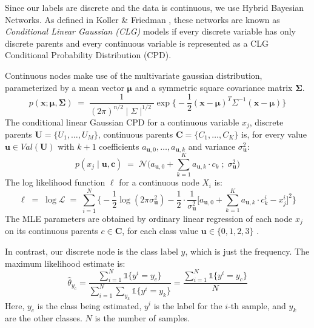 \documentclass{article}
\begin{document}
Since our labels are discrete and the data is continuous, we use
Hybrid Bayesian Networks. As defined in Koller \& Friedman \cite{koller},
these networks are known as \textit{Conditional Linear Gaussian (CLG)} models if
every discrete variable has only discrete parents and every continuous variable
is represented as a CLG Conditional Probability Distribution (CPD).

Continuous nodes make use of the multivariate gaussian distribution, parameterized
by a mean vector $\mathbf{\mu}$ and a symmetric square covariance matrix
$\mathbf{\Sigma}$.
\begin{equation}
  p(\mathbf{x}; \mathbf{\mu}, \mathbf{\Sigma}) \; = \; \frac{1}{(2 \pi)^{n/2} \mid \Sigma \mid^{1/2}} \exp \Big\{ -\frac{1}{2} (\mathbf{x} - \mathbf{\mu})^T \Sigma^{-1} (\mathbf{x} - \mathbf{\mu})  \Big\}
\end{equation}
The conditional linear Gaussian CPD for a continuous variable $x_j$, discrete
parents $\mathbf{U} = \{U_1, \hdots, U_M\}$, continuous parents
$\mathbf{C} = \{C_1, \hdots, C_K\}$ is, for every value
$\mathbf{u} \in Val(\mathbf{U})$ with $k+1$ coefficients
$a_{\mathbf{u},0}, \hdots, a_{\mathbf{u}, k}$ and variance
$\sigma^2_{\mathbf{u}}$:
\begin{equation}
  p(x_j \mid \mathbf{u}, \mathbf{c}) \; = \; \mathcal{N} \Bigg(a_{\mathbf{u},0} + \sum_{k=1}^K a_{\mathbf{u},k} \cdot c_k \; ; \; \sigma^2_{\mathbf{u}}  \Bigg)
\end{equation}
The log likelihood function $\ell$ for a continuous node $X_i$ is:
\begin{equation}
  \ell \; = \; \log \mathcal{L} \; = \; \sum_{i=1}^{N} \Bigg\{ -\frac{1}{2} \log (2\pi \sigma^2_{\mathbf{u}}) - \frac{1}{2} \cdot \frac{1}{\sigma^2_{\mathbf{u}}} \Bigg[ a_{\mathbf{u},0} + \sum_{k=1}^K a_{\mathbf{u},k} \cdot c_k^i - x_j^i \Bigg]^2 \Bigg\}
\end{equation}
The MLE parameters are obtained by ordinary linear regression of each node $x_j$
on its continuous parents $c \in \mathbf{C}$, for each class value
$\mathbf{u} \in \{0, 1, 2, 3\}$ \cite{koller}.

In contrast, our discrete node is the class label $y$, which is just the frequency.
The maximum likelihood estimate is:
\begin{equation}
  \hat{\theta}_{y_c} = \frac{ \sum_{i=1}^{N} \mathds{1} \{ y^{i} = y_c \} }{ \sum_{i=1}^{N} \sum_{y_k} \mathds{1} \{y^i = y_k\} } = \frac{\sum_{i=1}^{N} \mathds{1} \{ y^{i} = y_c \}}{N}
\end{equation}
Here, $y_c$ is the class being estimated, $y^i$ is the label for the $i$-th sample,
and $y_k$ are the other classes. $N$ is the number of samples.
\end{document}
